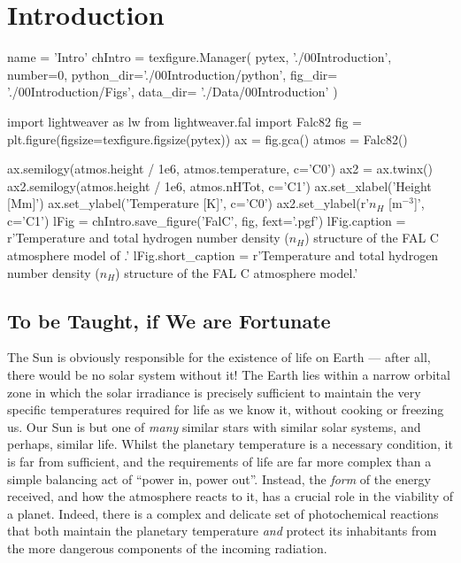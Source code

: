 \chapter{Introduction}
\begin{pycode}[Intro]
name = 'Intro'
chIntro = texfigure.Manager(
    pytex,
    './00Introduction',
    number=0,
    python_dir='./00Introduction/python',
    fig_dir=   './00Introduction/Figs',
    data_dir=  './Data/00Introduction'
)
\end{pycode}


\begin{pycode}[Intro]
import lightweaver as lw
from lightweaver.fal import Falc82
fig = plt.figure(figsize=texfigure.figsize(pytex))
ax = fig.gca()
atmos = Falc82()

ax.semilogy(atmos.height / 1e6, atmos.temperature, c='C0')
ax2 = ax.twinx()
ax2.semilogy(atmos.height / 1e6, atmos.nHTot, c='C1')
ax.set_xlabel('Height [Mm]')
ax.set_ylabel('Temperature [K]', c='C0')
ax2.set_ylabel(r'$n_H$ [m$^{-3}$]', c='C1')
lFig = chIntro.save_figure('FalC', fig, fext='.pgf')
lFig.caption = r'Temperature and total hydrogen number density ($n_H$) structure of the FAL C atmosphere model of \citep{Fontenla1993}.'
lFig.short_caption = r'Temperature and total hydrogen number density ($n_H$) structure of the FAL C atmosphere model.'
\end{pycode}

\section*{To be Taught, if We are Fortunate}

The Sun is obviously responsible for the existence of life on Earth --- after all, there would be no solar system without it!
The Earth lies within a narrow orbital zone in which the solar irradiance is precisely sufficient to maintain the very specific temperatures required for life as we know it, without cooking or freezing us.
Our Sun is but one of \emph{many} similar stars with similar solar systems, and perhaps, similar life.
Whilst the planetary temperature is a necessary condition, it is far from sufficient, and the requirements of life are far more complex than a simple balancing act of ``power in, power out''.
Instead, the \emph{form} of the energy received, and how the atmosphere reacts to it, has a crucial role in the viability of a planet.
Indeed, there is a complex and delicate set of photochemical reactions that both maintain the planetary temperature \emph{and} protect its inhabitants from the more dangerous components of the incoming radiation.

